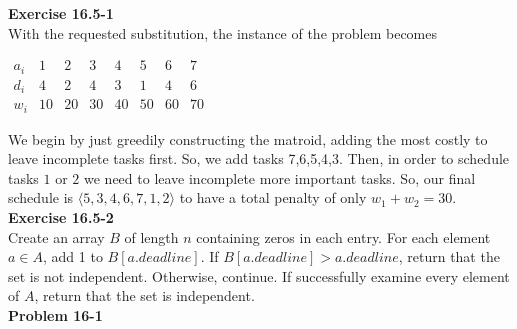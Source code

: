\documentclass{article}
\begin{document}
\noindent\textbf{Exercise 16.5-1}\\

With the requested substitution, the instance of the problem becomes

$
\begin{array}{c|ccccccc}
a_i&1&2&3&4&5&6&7\\
\hline 
d_i&4&2&4&3&1&4&6\\
w_i &10&20&30&40&50&60&70
\end{array}
$

We begin by just greedily constructing the matroid, adding the most costly to leave incomplete tasks first. So, we add tasks 7,6,5,4,3. Then, in order to schedule tasks $1$ or $2$ we need to leave incomplete more important tasks. So, our final schedule is $\langle 5,3,4,6,7,1,2\rangle$ to have a total penalty of only $w_1+w_2=30$.\\

\noindent\textbf{Exercise 16.5-2}\\

Create an array $B$ of length $n$ containing zeros in each entry.  For each element $a \in A$, add 1 to $B[a.deadline]$.  If $B[a.deadline] > a.deadline$, return that the set is not independent.  Otherwise, continue.  If successfully examine every element of $A$, return that the set is independent.  \\

\noindent\textbf{Problem 16-1}\\
\end{document}
